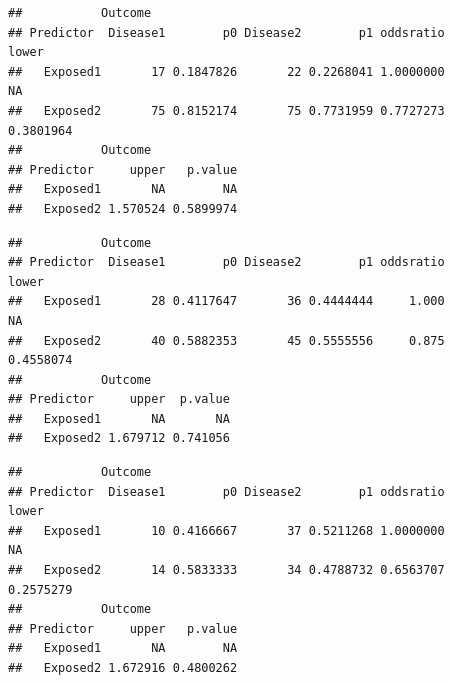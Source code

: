 \documentclass[]{article}
\newenvironment{Shaded}{\begin{snugshade}}{\end{snugshade}}
\newcommand{\KeywordTok}[1]{\textcolor[rgb]{0.13,0.29,0.53}{\textbf{#1}}}
\newcommand{\DecValTok}[1]{\textcolor[rgb]{0.00,0.00,0.81}{#1}}
\newcommand{\CommentTok}[1]{\textcolor[rgb]{0.56,0.35,0.01}{\textit{#1}}}
\newcommand{\OperatorTok}[1]{\textcolor[rgb]{0.81,0.36,0.00}{\textbf{#1}}}
\newcommand{\NormalTok}[1]{#1}
\begin{document}
\begin{Shaded}
\end{Shaded}

\begin{verbatim}
##           Outcome
## Predictor  Disease1        p0 Disease2        p1 oddsratio     lower
##   Exposed1       17 0.1847826       22 0.2268041 1.0000000        NA
##   Exposed2       75 0.8152174       75 0.7731959 0.7727273 0.3801964
##           Outcome
## Predictor     upper   p.value
##   Exposed1       NA        NA
##   Exposed2 1.570524 0.5899974
\end{verbatim}

\begin{Shaded}
\end{Shaded}

\begin{verbatim}
##           Outcome
## Predictor  Disease1        p0 Disease2        p1 oddsratio     lower
##   Exposed1       28 0.4117647       36 0.4444444     1.000        NA
##   Exposed2       40 0.5882353       45 0.5555556     0.875 0.4558074
##           Outcome
## Predictor     upper  p.value
##   Exposed1       NA       NA
##   Exposed2 1.679712 0.741056
\end{verbatim}

\begin{Shaded}
\end{Shaded}

\begin{verbatim}
##           Outcome
## Predictor  Disease1        p0 Disease2        p1 oddsratio     lower
##   Exposed1       10 0.4166667       37 0.5211268 1.0000000        NA
##   Exposed2       14 0.5833333       34 0.4788732 0.6563707 0.2575279
##           Outcome
## Predictor     upper   p.value
##   Exposed1       NA        NA
##   Exposed2 1.672916 0.4800262
\end{verbatim}
\end{document}
